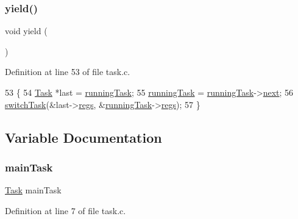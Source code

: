 \subsubsection{\texorpdfstring{yield()}{yield()}}
{\footnotesize\ttfamily void yield (\begin{DoxyParamCaption}{ }\end{DoxyParamCaption})}



Definition at line 53 of file task.\+c.


\begin{DoxyCode}
53              \{
54     \hyperlink{a00134}{Task} *last = \hyperlink{a00044_a2c195d425b4a6791b3a89f7b219f93d9_a2c195d425b4a6791b3a89f7b219f93d9}{runningTask};
55     \hyperlink{a00044_a2c195d425b4a6791b3a89f7b219f93d9_a2c195d425b4a6791b3a89f7b219f93d9}{runningTask} = \hyperlink{a00044_a2c195d425b4a6791b3a89f7b219f93d9_a2c195d425b4a6791b3a89f7b219f93d9}{runningTask}->\hyperlink{a00134_a8b6b50960a19f7bae344ef0cc8ec4e7d_a8b6b50960a19f7bae344ef0cc8ec4e7d}{next};
56     \hyperlink{a00047_a2425ca34147fccde2d1503332d21c5bd_a2425ca34147fccde2d1503332d21c5bd}{switchTask}(&last->\hyperlink{a00134_a136b243ee52ff89e9ba97f4e4dba19bb_a136b243ee52ff89e9ba97f4e4dba19bb}{regs}, &\hyperlink{a00044_a2c195d425b4a6791b3a89f7b219f93d9_a2c195d425b4a6791b3a89f7b219f93d9}{runningTask}->\hyperlink{a00134_a136b243ee52ff89e9ba97f4e4dba19bb_a136b243ee52ff89e9ba97f4e4dba19bb}{regs});
57 \}
\end{DoxyCode}


\subsection{Variable Documentation}
\mbox{\label{a00044_a228ac88416ebaa8713846e3e5e3e9b6d_a228ac88416ebaa8713846e3e5e3e9b6d}} 
\subsubsection{\texorpdfstring{main\+Task}{mainTask}}
{\footnotesize\ttfamily \hyperlink{a00134}{Task} main\+Task\hspace{0.3cm}{\ttfamily [static]}}



Definition at line 7 of file task.\+c.

\mbox{\label{a00044_ab0e87ab98b8b029839a398838d16e1f0_ab0e87ab98b8b029839a398838d16e1f0}} 
